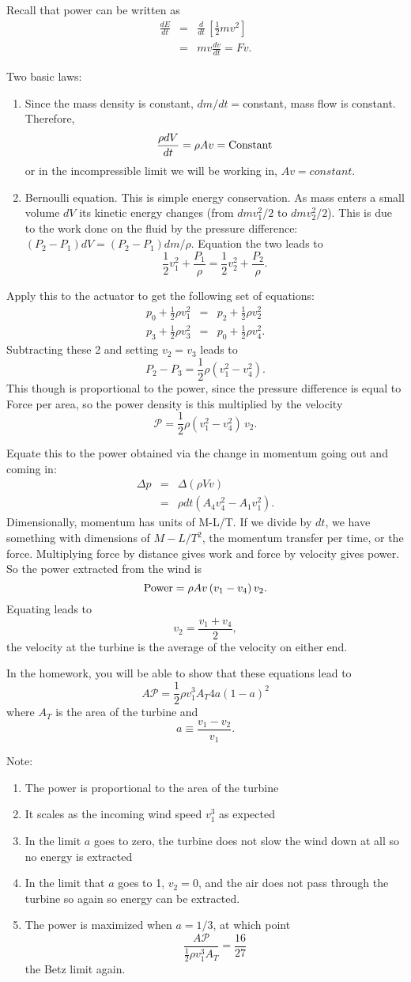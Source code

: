 \documentclass[11pt]{book}
\def\be{\begin{equation}}
\def\ee{\end{equation}}
\def\bea{\begin{eqnarray}}
\def\eea{\end{eqnarray}}
\newcommand{\vs}{\nonumber\\}
\newcommand\bee{\begin{enumerate}}
\newcommand\eee{\end{enumerate}}
\begin{document}
Recall that power can be written as
\bea
\frac{dE}{dt} &=& \frac{d}{dt}\,\left[ \frac 12 mv^2\right]\vs
&=& mv \frac{dv}{dt} = Fv.\eea

Two basic laws:
\bee
\item  Since the mass density is constant, $dm/dt=$constant, mass flow is constant. Therefore, 
\be
\frac{\rho dV}{dt} = \rho A v = {\rm Constant}
\ee
or in the incompressible limit we will be working in, $Av=constant$.
\item Bernoulli equation. This is simple energy conservation. As mass enters a small volume $dV$ its kinetic energy changes (from $dm v_1^2/2$ to $dm v_2^2/2$). This is due to the work done on the fluid by the pressure difference: $(P_2-P_1)dV = (P_2-P_1)dm/\rho$. Equation the two leads to
\be
\frac12 v_1^2 + \frac{P_1}\rho = \frac12 v_2^2 + \frac{P_2}\rho .\ee
\eee

Apply this to the actuator to get the following set of equations:
\bea
p_0 + \frac12\rho v_1^2 &=& p_2 + \frac12\rho v_2^2\vs
p_3+ \frac12\rho v_3^2 &=& p_0 + \frac12\rho v_4^2.\eea
Subtracting these 2 and setting $v_2=v_3$ leads to
\be
P_2-P_3 = \frac12\rho\left(v_1^2-v_4^2\right).
\ee
This though is proportional to the power, since the pressure difference is equal to Force per area, so the power density is this multiplied by the velocity
\be
\mathcal{P} =  \frac12\rho\left(v_1^2-v_4^2\right)\,v_2
.\ee

Equate this to the power obtained via the change in momentum going out and coming in:
\bea
\Delta p &=&  \Delta (\rho V v)\vs
&=& \rho dt \left( A_4 v_4^2 - A_1 v_1^2 \right).\eea
Dimensionally, momentum has units of M-L/T. If we divide by $dt$, we have something with dimensions of $M-L/T^2$, the momentum transfer per time, or the force. Multiplying force by distance gives work and force by velocity gives power. So the power extracted from the wind is
\be
{\rm Power} = \rho Av \left( v_1-v_4\right)v_2.\ee
Equating leads to
\be
v_2 = \frac{v_1+v_4}2,\ee
the velocity at the turbine is the average of the velocity on either end.

In the homework, you will be able to show that these equations lead to
\be
A\mathcal{P}= \frac12\rho v_1^3A_T4a(1-a)^2
\ee
where $A_T$ is the area of the turbine and 
\be
a\equiv \frac{v_1-v_2}{v_1}.\ee

Note:
\bee
\item The power is proportional to the area of the turbine
\item It scales as the incoming wind speed $v_1^3$ as expected
\item In the limit $a$ goes to zero, the turbine does not slow the wind down at all so no energy is extracted
\item In the limit that $a$ goes to 1, $v_2=0$, and the air does not pass through the turbine so again so energy can be extracted.
\item The power is maximized when $a=1/3$, at which point 
\be
\frac{A\mathcal{P}}{\frac12\rho v_1^3A_T} = \frac{16}{27}
\ee
the Betz limit again.
\eee
\end{document}
